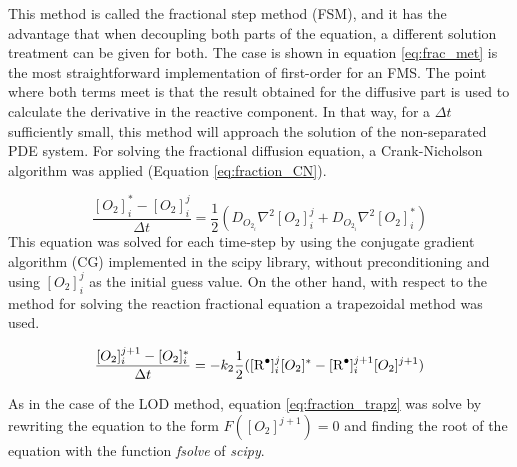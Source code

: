 \begin{refsection}
This method is called the fractional step method (FSM), and it has the advantage that when decoupling both parts of the equation, a different solution treatment can be given for both. The case is shown in equation  \ref{eq:frac_met} is the most straightforward implementation of first-order for an FMS. The point where both terms meet is that the result obtained for the diffusive part is used to calculate the derivative in the reactive component. In that way, for a $\Delta t$ sufficiently small, this method will approach the solution of the non-separated PDE system. For solving the fractional diffusion equation, a Crank-Nicholson algorithm was applied (Equation \ref{eq:fraction_CN}).

\begin{equation}
    \frac{[O_2]_i^*-[O_2]_i^j}{\Delta t} = \frac{1}{2}(D_{O_{2_i}}\nabla^2[O_2]_i^j + D_{O_{2_i}}\nabla^2[O_2]_i^*)
    \label{eq:fraction_CN}
\end{equation}
This equation was solved for each time-step by using the conjugate gradient algorithm (CG) implemented in the scipy library, without preconditioning and using $[O_2]_i^j$ as the initial guess value. On the other hand, with respect to the method for solving the reaction fractional equation a trapezoidal method was used.

\begin{equation}
    \frac{[O_2]_i^{j+1}-[O_2]_i^*}{\Delta t}= -k_2 \frac{1}{2}([\ce{R^.}]_i^j[O_2]^*-[\ce{R^.}]_i^{j+1}[O_2]^{j+1}) \label{eq:fraction_trapz}
\end{equation}

As in the case of the LOD method, equation \ref{eq:fraction_trapz} was solve by  rewriting the equation to the form $F([O_2]^{j+1})=0$ and finding the root of the equation with the function \textit{fsolve} of \textit{scipy}. 


\end{refsection}
